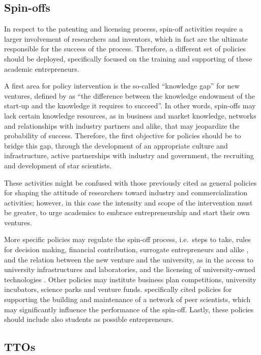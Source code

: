 \subsection{Spin-offs}

In respect to the patenting and licensing process, spin-off activities require a larger involvement of researchers and inventors, which in fact are the ultimate responsible for the success of the process. Therefore, a different set of policies should be deployed, specifically focused on the training and supporting of these academic entrepreneurs.

A first area for policy intervention is the so-called \enquote{knowledge gap} for new ventures, defined by \citet{Lockett2005a} as \enquote{the difference between the knowledge endowment of the start-up and the knowledge it requires to succeed}. In other words, spin-offs may lack certain knowledge resources, as in business and market knowledge, networks and relationships with industry partners and alike, that may jeopardize the probability of success. Therefore, the first objective for policies should be to bridge this gap, through the development of an appropriate culture and infrastructure, active partnerships with industry and government, the recruiting and development of star scientists. 

These activities might be confused with those previously cited as general policies for shaping the attitude of researchers toward industry and commercialization activities; however, in this case the intensity and scope of the intervention must be greater, to urge academics to embrace entrepreneurship and start their own ventures.

More specific policies may regulate the spin-off process, i.e.\ steps to take, rules for decision making, financial contribution, surrogate entrepreneurs and alike \citep{Franklin2001}, and the relation between the new venture and the university, as in the access to university infrastructures and laboratories, and the licensing of university-owned technologies \citep{Fini2009}. Other policies may institute business plan competitions, university incubators, science parks and venture funds. \citet{Siegel2007} specifically cited policies for supporting the building and maintenance of a network of peer scientists, which may significantly influence the performance of the spin-off. Lastly, these policies should include also students as possible entrepreneurs. 

\subsection{TTOs}

